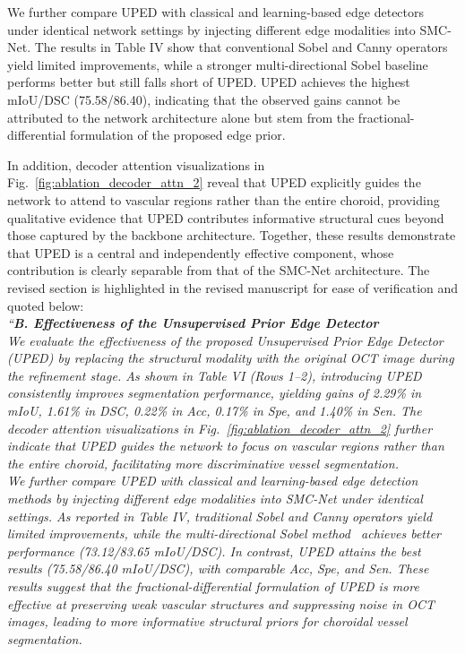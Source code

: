 \documentclass[11pt]{article}
\begin{document}
\begin{enumerate}
{    We further compare UPED with classical and learning-based edge detectors under identical network settings by injecting different edge modalities into SMC-Net. The results in Table IV show that conventional Sobel and Canny operators yield limited improvements, while a stronger multi-directional Sobel baseline~\cite{dual_encoder_edge} performs better but still falls short of UPED. UPED achieves the highest mIoU/DSC (75.58/86.40), indicating that the observed gains cannot be attributed to the network architecture alone but stem from the fractional-differential formulation of the proposed edge prior.

    In addition, decoder attention visualizations in Fig.~\ref{fig:ablation_decoder_attn_2} reveal that UPED explicitly guides the network to attend to vascular regions rather than the entire choroid, providing qualitative evidence that UPED contributes informative structural cues beyond those captured by the backbone architecture. Together, these results demonstrate that UPED is a central and independently effective component, whose contribution is clearly separable from that of the SMC-Net architecture.
    The revised section is highlighted in the revised manuscript for ease of verification and quoted below:\\
    \textit{{\color{blue}``\textbf{B. Effectiveness of the Unsupervised Prior Edge Detector}\\
    We evaluate the effectiveness of the proposed Unsupervised Prior Edge Detector (UPED) by replacing the structural modality with the original OCT image during the refinement stage.
    As shown in Table VI (Rows 1--2), introducing UPED consistently improves segmentation performance, yielding gains of 2.29\% in mIoU, 1.61\% in DSC, 0.22\% in Acc, 0.17\% in Spe, and 1.40\% in Sen.
    The decoder attention visualizations in Fig.~\ref{fig:ablation_decoder_attn_2} further indicate that UPED guides the network to focus on vascular regions rather than the entire choroid, facilitating more discriminative vessel segmentation.\\
    We further compare UPED with classical and learning-based edge detection methods by injecting different edge modalities into SMC-Net under identical settings.
    As reported in Table IV, traditional Sobel and Canny operators yield limited improvements, while the multi-directional Sobel method~\cite{dual_encoder_edge} achieves better performance (73.12/83.65 mIoU/DSC).
    In contrast, UPED attains the best results (75.58/86.40 mIoU/DSC), with comparable Acc, Spe, and Sen.
    These results suggest that the fractional-differential formulation of UPED is more effective at preserving weak vascular structures and suppressing noise in OCT images, leading to more informative structural priors for choroidal vessel segmentation.
}}}
\end{enumerate}
\end{document}
